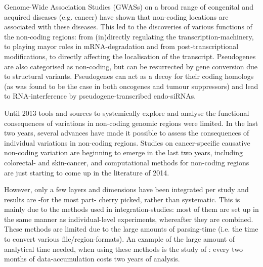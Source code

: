 \documentclass[twoside,fontsize=12pt]{article}
\begin{document}
\noindent
Genome-Wide Association Studies (GWASs) on a broad range of congenital and acquired diseases (e.g. cancer) have shown that non-coding locations are associated with these diseases. This led to the discoveries of various functions of the non-coding regions: from (in)directly regulating the transcription-machinery, to playing mayor roles in mRNA-degradation and from post-transcriptional modifications, to directly affecting the localisation of the transcript\cite{Pichon2012,Barrett2012}. Pseudogenes are also categorised as non-coding, but can be resurrected by gene conversion due to structural variants\cite{Kidd2010}. Pseudogenes can act as a decoy for their coding homologs\cite{Poliseno2010} (as was found to be the case in both oncogenes and tumour suppressors) and lead to RNA-interference by pseudogene-transcribed endo-siRNAs\cite{Tam2008}.

Until 2013 tools and sources to systemically explore and analyse the functional consequences of variations in non-coding genomic regions were limited. In the last two years, several advances have made it possible to assess the consequences of individual variations in non-coding regions\cite{Ongen2014,Khurana2013}. Studies on cancer-specific causative non-coding variation are beginning to emerge in the last two years, including colorectal- and skin-cancer\cite{Ongen2014,Huang2013}, and computational methods for non-coding regions are just starting to come up in the literature of 2014\cite{Khurana2013,Kircher2014}. %
\medskip

\noindent
However, only a few layers and dimensions have been integrated per study and results are -for the most part- cherry picked, rather than systematic. This is mainly due to the methods used in integration-studies: most of them are set up in the same manner as individual-level experiments, whereafter they are combined. These methods are limited due to the large amounts of parsing-time (i.e. the time to convert various file/region-formats). An example of the large amount of analytical time needed, when using these methods is the study of \citet{Munoz2011}: every two months of data-accumulation costs two years of analysis.
\end{document}
